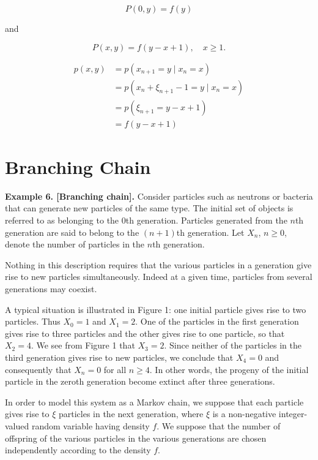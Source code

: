 \documentclass[12pt,openany]{book}
\theoremstyle{definition}
\begin{document}
	\[ P(0, y) = f(y) \]
	
	and
	
	\[ P(x, y) = f(y - x + 1), \quad x \geq 1. \]
	
	\begin{align*}
		p(x,y)&=p(x_{n+1}=y\mid x_n=x)\\
		&=p(x_n+\xi_{n+1}-1=y\mid x_n=x)\\
		&=p(\xi_{n+1}=y-x+1)\\
		&=f(y-x+1)
	\end{align*}
	
	\section{Branching Chain}
	\textbf{Example 6. [Branching chain].} Consider particles such as neutrons or bacteria that can generate new particles of the same type. The initial set of objects is referred to as belonging to the 0th generation. Particles generated from the \(n\)th generation are said to belong to the \((n + 1)\)th generation. Let \(X_n\), \(n \geq 0\), denote the number of particles in the \(n\)th generation.
	
	Nothing in this description requires that the various particles in a generation give rise to new particles simultaneously. Indeed at a given time, particles from several generations may coexist.
	
	A typical situation is illustrated in Figure 1: one initial particle gives rise to two particles. Thus \(X_0 = 1\) and \(X_1 = 2\). One of the particles in the first generation gives rise to three particles and the other gives rise to one particle, so that \(X_2 = 4\). We see from Figure 1 that \(X_3 = 2\). Since neither of the particles in the third generation gives rise to new particles, we conclude that \(X_4 = 0\) and consequently that \(X_n = 0\) for all \(n \geq 4\). In other words, the progeny of the initial particle in the zeroth generation become extinct after three generations.
	
	
	In order to model this system as a Markov chain, we suppose that each particle gives rise to \(\xi\) particles in the next generation, where \(\xi\) is a non-negative integer-valued random variable having density \(f\). We suppose that the number of offspring of the various particles in the various generations are chosen independently according to the density \(f\).
	
\end{document}
